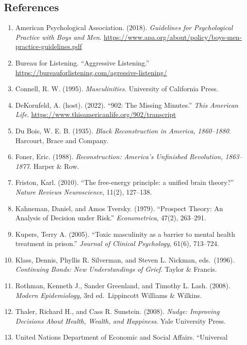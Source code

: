 \documentclass[
  11pt,
  letterpaper,
]{article}
\providecommand{\tightlist}{%
  \setlength{\itemsep}{0pt}\setlength{\parskip}{0pt}}
\begin{document}
\subsection{References}\label{references}

\begin{enumerate}
\def\labelenumi{\arabic{enumi}.}
\tightlist
\item
  American Psychological Association. (2018). \emph{Guidelines for
  Psychological Practice with Boys and Men}.
  \url{https://www.apa.org/about/policy/boys-men-practice-guidelines.pdf}
\item
  Bureau for Listening. ``Aggressive Listening.''
  \url{https://bureauforlistening.com/agressive-listening/}
\item
  Connell, R. W. (1995). \emph{Masculinities}. University of California
  Press.
\item
  DeKornfeld, A. (host). (2022). ``902: The Missing Minutes.''
  \emph{This American Life}.
  \url{https://www.thisamericanlife.org/902/transcript}
\item
  Du Bois, W. E. B. (1935). \emph{Black Reconstruction in America,
  1860--1880}. Harcourt, Brace and Company.
\item
  Foner, Eric. (1988). \emph{Reconstruction: America's Unfinished
  Revolution, 1863--1877}. Harper \& Row.
\item
  Friston, Karl. (2010). ``The free-energy principle: a unified brain
  theory?'' \emph{Nature Reviews Neuroscience}, 11(2), 127--138.
\item
  Kahneman, Daniel, and Amos Tversky. (1979). ``Prospect Theory: An
  Analysis of Decision under Risk.'' \emph{Econometrica}, 47(2),
  263--291.
\item
  Kupers, Terry A. (2005). ``Toxic masculinity as a barrier to mental
  health treatment in prison.'' \emph{Journal of Clinical Psychology},
  61(6), 713--724.
\item
  Klass, Dennis, Phyllis R. Silverman, and Steven L. Nickman,
  eds.~(1996). \emph{Continuing Bonds: New Understandings of Grief}.
  Taylor \& Francis.
\item
  Rothman, Kenneth J., Sander Greenland, and Timothy L. Lash. (2008).
  \emph{Modern Epidemiology}, 3rd ed.~Lippincott Williams \& Wilkins.
\item
  Thaler, Richard H., and Cass R. Sunstein. (2008). \emph{Nudge:
  Improving Decisions About Health, Wealth, and Happiness}. Yale
  University Press.
\item
  United Nations Department of Economic and Social Affairs. ``Universal

\end{enumerate}
\end{document}
